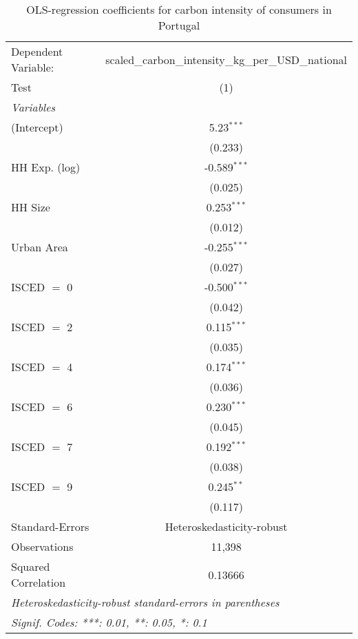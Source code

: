 
\begin{table}[htbp!]
   \centering
   \small
   \begin{adjustbox}{width = 1\textwidth, max height = 0.95\textheight, center}
      \begin{threeparttable}[b]
         \caption{\label{tab:OLS_1_PRT} OLS-regression coefficients for carbon intensity of consumers in Portugal}
         \begin{tabular}{lc}
            \tabularnewline \midrule \midrule
            Dependent Variable: & scaled\_carbon\_intensity\_kg\_per\_USD\_national\\        
            Test                & (1)\\  
            \midrule
            \emph{Variables}\\
            (Intercept)         & 5.23$^{***}$\\   
                                & (0.233)\\   
            HH Exp. (log)       & -0.589$^{***}$\\   
                                & (0.025)\\   
            HH Size             & 0.253$^{***}$\\   
                                & (0.012)\\   
            Urban Area          & -0.255$^{***}$\\   
                                & (0.027)\\   
            ISCED $=$ 0         & -0.500$^{***}$\\   
                                & (0.042)\\   
            ISCED $=$ 2         & 0.115$^{***}$\\   
                                & (0.035)\\   
            ISCED $=$ 4         & 0.174$^{***}$\\   
                                & (0.036)\\   
            ISCED $=$ 6         & 0.230$^{***}$\\   
                                & (0.045)\\   
            ISCED $=$ 7         & 0.192$^{***}$\\   
                                & (0.038)\\   
            ISCED $=$ 9         & 0.245$^{**}$\\   
                                & (0.117)\\   
            \midrule 
            Standard-Errors     & Heteroskedasticity-robust \\   
            Observations        & 11,398\\  
            Squared Correlation & 0.13666\\  
            \midrule \midrule
            \multicolumn{2}{l}{\emph{Heteroskedasticity-robust standard-errors in parentheses}}\\
            \multicolumn{2}{l}{\emph{Signif. Codes: ***: 0.01, **: 0.05, *: 0.1}}\\
         \end{tabular}
         

\end{threeparttable}
\end{adjustbox}
\end{table}
